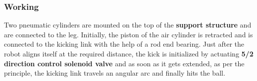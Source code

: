 

        \subsubsection{Working}
            Two pneumatic cylinders are mounted on the top of the \textbf{support structure} and are connected to the leg. Initially, the 
            piston of the air cylinder is retracted and is connected to the kicking link with the help of a rod end bearing. Just after the robot
            aligns itself at the required distance, the kick is initialized by actuating \textbf{5/2 direction control solenoid valve} and as soon
            as it gets extended, as per the principle, the kicking link travels an angular arc and finally hits the ball.

            \vspace{0.5cm}

